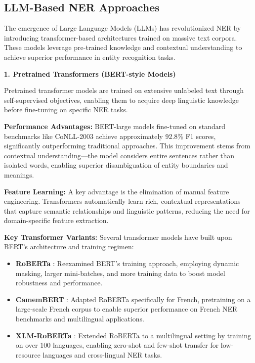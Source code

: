 \documentclass[12pt,a4paper]{article}
\begin{document}
\subsection{LLM-Based NER Approaches}

The emergence of Large Language Models (LLMs) has revolutionized NER by introducing transformer-based architectures trained on massive text corpora. These models leverage pre-trained knowledge and contextual understanding to achieve superior performance in entity recognition tasks.

\textbf{1. Pretrained Transformers (BERT-style Models)}

Pretrained transformer models are trained on extensive unlabeled text through self-supervised objectives, enabling them to acquire deep linguistic knowledge before fine-tuning on specific NER tasks.

\textbf{Performance Advantages:} BERT-large models fine-tuned on standard benchmarks like CoNLL-2003 achieve approximately 92.8\% F1 scores, significantly outperforming traditional approaches. This improvement stems from contextual understanding—the model considers entire sentences rather than isolated words, enabling superior disambiguation of entity boundaries and meanings.

\textbf{Feature Learning:} A key advantage is the elimination of manual feature engineering. Transformers automatically learn rich, contextual representations that capture semantic relationships and linguistic patterns, reducing the need for domain-specific feature extraction.

\textbf{Key Transformer Variants:} Several transformer models have built upon BERT's architecture and training regimen:
\begin{itemize}
  \item \textbf{RoBERTa} \cite{liu2019roberta}: Reexamined BERT's training approach, employing dynamic masking, larger mini-batches, and more training data to boost model robustness and performance.
  \item \textbf{CamemBERT} \cite{martin2020camembert}: Adapted RoBERTa specifically for French, pretraining on a large-scale French corpus to enable superior performance on French NER benchmarks and multilingual applications.
  \item \textbf{XLM-RoBERTa} \cite{conneau2019unsupervised}: Extended RoBERTa to a multilingual setting by training on over 100 languages, enabling zero-shot and few-shot transfer for low-resource languages and cross-lingual NER tasks.
\end{itemize}
\end{document}
